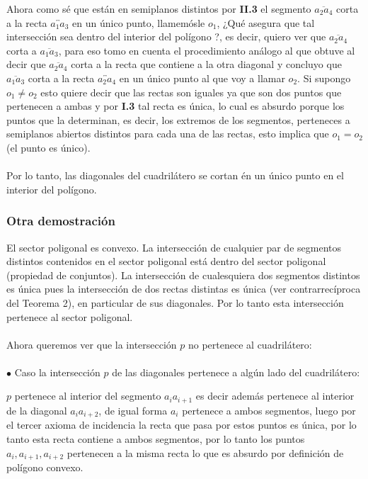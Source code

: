 \documentclass[a4paper]{article}
\begin{document}
Ahora como sé que están en semiplanos distintos por \textbf{II.3} el segmento $\overline{a_2a_4}$ corta a la recta $\overleftrightarrow{a_1a_3}$ en un único punto, llamemósle $o_1$, ¿Qué asegura que tal intersección sea dentro del interior del polígono ?, es decir, quiero ver que $\overline{a_2a_4}$ corta a $\overline{a_1a_3}$, para eso tomo en cuenta el procedimiento análogo al que obtuve al decir que $\overline{a_2a_4}$ corta a la recta que contiene a la otra diagonal y concluyo que $\overline{a_1a_3}$ corta a la recta $\overleftrightarrow{a_2a_4}$ en un único punto al que voy a llamar $o_2$. Si supongo $o_1 \neq o_2$ esto quiere decir que las rectas son iguales ya que son dos puntos que pertenecen a ambas y por \textbf{I.3} tal recta es única, lo cual es absurdo porque los puntos que la determinan, es decir, los extremos de los segmentos, perteneces a semiplanos abiertos distintos para cada una de las rectas, esto implica que $o_1=o_2$ (el punto es único).\\\\
Por lo tanto, las diagonales del cuadrilátero se cortan én un único punto en el interior del polígono.

\subsubsection{Otra demostración}
El sector poligonal es convexo. La intersección de cualquier par de segmentos distintos contenidos en el sector poligonal está dentro del sector poligonal (propiedad de conjuntos). La intersección de cualesquiera dos segmentos distintos es única pues la intersección de dos rectas distintas es única (ver contrarrecíproca del Teorema 2), en particular de sus diagonales. Por lo tanto esta intersección pertenece al sector poligonal.\\\\

Ahora queremos ver que la intersección $p$ no pertenece al cuadrilátero:\\\\

$\bullet$ Caso la intersección $p$ de las diagonales pertenece a algún lado del cuadrilátero:  

$p$ pertenece al interior del segmento $a_{i}a_{i+1}$ es decir además pertenece
al interior de la diagonal $a_{i}a_{i+2}$, de igual forma $a_{i}$ pertenece a
ambos segmentos, luego por el tercer axioma de incidencia la recta que pasa por
estos puntos es única, por lo tanto esta recta contiene a ambos segmentos,
por lo tanto los puntos $a_{i},a_{i+1},a_{i+2}$ pertenecen a la
misma recta lo que es absurdo por definición de polígono convexo.\\\\
\end{document}
